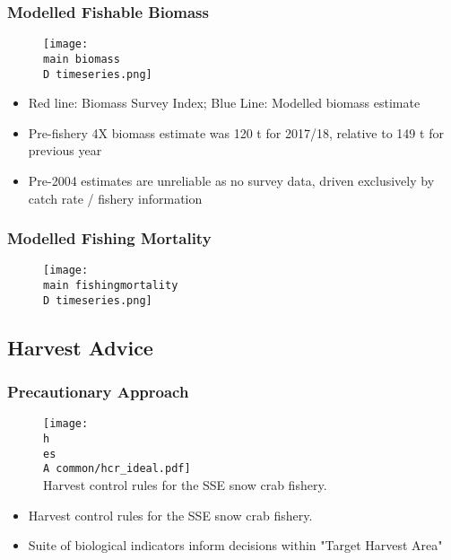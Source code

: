 \documentclass{beamer}
\numberwithin{equation}{section}		%
\numberwithin{figure}{section}	   	%
\numberwithin{table}{section}				%
\newcommand{\D}{.}  %
\newcommand{\h}{C:/} %
\newcommand{\es}{bio.data/bio.snowcrab/} %
\newcommand{\A}{assessments/}
\newcommand{\main}{C:/bio.data/bio.snowcrab/assessments/2018/presentations/4X/}
\begin{document}
%
%
\begin{frame}
\frametitle{Modelled Fishable Biomass}
\begin{figure}
	\centering
	\texttt{[image: \\main biomass\\D timeseries.png]}\\ 
\end{figure}
\vspace*{-0.3cm}
\begin{itemize}
	\item Red line: Biomass Survey Index; Blue Line: Modelled biomass estimate 
	\item Pre-fishery 4X biomass estimate was 120 t for 2017/18, relative to 149 t for previous year 
	\item Pre-2004 estimates are unreliable as no survey data, driven exclusively by catch rate / fishery information	
\end{itemize}

\end{frame}


\begin{frame}
\frametitle{Modelled Fishing Mortality}
\begin{figure}
\centering
\texttt{[image: \\main fishingmortality\\D timeseries.png]}\\
\end{figure}
\end{frame}


\subsection{Harvest Advice}

\begin{frame}
\frametitle{Precautionary Approach}
\begin{figure}
	\centering
	\texttt{[image: \\h \\es \\A common/hcr\_ideal.pdf]}\\ 
Harvest control rules for the SSE snow crab fishery.
\end{figure}
\begin{itemize}
	\item Harvest control rules for the SSE snow crab fishery.
	\item Suite of biological indicators inform decisions within "Target Harvest Area"
\end{itemize}
\end{frame}
\end{document}
